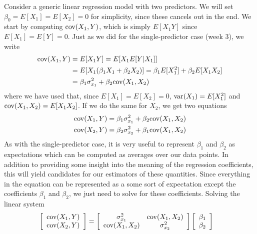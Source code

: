  Consider a generic linear regression model with two predictors. We will set $\beta_0=E[X_1]=E[X_2]=0$ for simplicity, since these cancels out in the end. We start by computing ${\rm cov}(X_1,Y)$, which is simply $E[X_1Y]$ since $E[X_1]=E[Y] = 0$. 
Just as we did for the single-predictor case (week 3), we write
\begin{align*}
{\rm cov}(X_1,Y) &= E[X_1Y] = E[X_1E[Y|X_1]] \\
&= E[X_1(\beta_1 X_1 + \beta_2 X_2)] = \beta_1 E[X_1^2] + \beta_2 E[X_1X_2]\\
&= \beta_1 \sigma_{x_1}^2  + \beta_2 {\rm cov}(X_1,X_2)
\end{align*}
where we have used that, since $E[X_1]=E[X_2]=0$, ${\rm var}(X_1) = E[X_1^2]$ and ${\rm cov}(X_1,X_2) = E[X_1X_2]$.
 If we do the same for $X_2$, we get two equations
 \begin{align*}
 {\rm cov}(X_1,Y)  &= \beta_1 \sigma_{x_1}^2  + \beta_2 {\rm cov}(X_1,X_2)\\
{\rm cov}(X_2,Y) &=   \beta_2 \sigma_{x_2}^2  + \beta_1 {\rm cov}(X_1,X_2)
 \end{align*}
As with the single-predictor case, it is very useful to represent $\beta_1$ and $\beta_2$ as expectations which can be computed as averages over our data points. In addition to providing some insight into the meaning of the regression coefficients, this will yield candidates for our estimators of these quantities. 
Since everything in the equation can be represented as a some sort of expectation except the coefficients $\beta_1$ and $\beta_2$, we just need to solve for these coefficients. Solving the linear system  
\begin{align*}
\left[\begin{array}{c}
{\rm cov}(X_1,Y) \\
{\rm cov}(X_2,Y)  
\end{array}\right] &= \left[\begin{array}{cc}
\sigma_{x_1}^2 & {\rm cov}(X_1,X_2)\\
 {\rm cov}(X_1,X_2) & \sigma_{x_2}^2
 \end{array} \right]\left[ \begin{array}{c}
\beta_1\\
  \beta_2\\
  \end{array}\right]
\end{align*}
